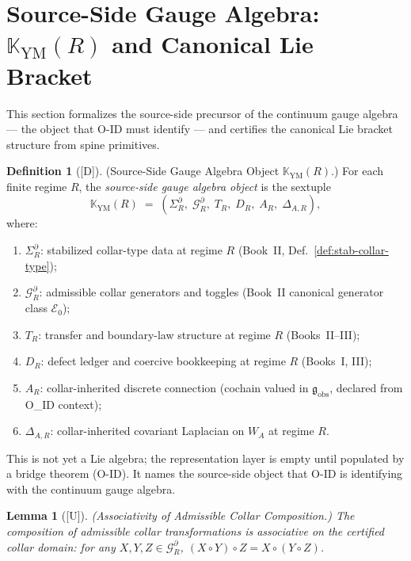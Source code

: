 \documentclass[12pt,oneside]{amsbook}
\theoremstyle{plain}
\newtheorem{lemma}[theorem]{Lemma}
\theoremstyle{definition}
\newtheorem{definition}[theorem]{Definition}
\theoremstyle{remark}
\newcommand{\status}[1]{\textup{[#1]}}
\begin{document}
\section{Source-Side Gauge Algebra: $\mathbb{K}_{\mathrm{YM}}(R)$ and
Canonical Lie Bracket}
\label{sec:kym-bracket}

This section formalizes the source-side precursor of the continuum
gauge algebra --- the object that O-ID must identify --- and
certifies the canonical Lie bracket structure from spine primitives.

\begin{definition}[\status{D}]\label{def:K-YM}
\textup{(Source-Side Gauge Algebra Object $\mathbb{K}_{\mathrm{YM}}(R)$.)}
For each finite regime $R$, the \emph{source-side gauge algebra object}
is the sextuple
\[
 \mathbb{K}_{\mathrm{YM}}(R) \;=\;
 (\Sigma_R^\partial,\; \mathcal{G}_R^\partial,\; T_R,\;
 D_R,\; A_R,\; \Delta_{A,R}),
\]
where:
\begin{enumerate}[label=\textup{(\arabic*)}]
 \item $\Sigma_R^\partial$: stabilized collar-type data at regime $R$
 (Book~II, Def.~\ref{def:stab-collar-type});
 \item $\mathcal{G}_R^\partial$: admissible collar generators and
 toggles (Book~II canonical generator class $\mathcal{E}_0$);
 \item $T_R$: transfer and boundary-law structure at regime $R$
 (Books~II--III);
 \item $D_R$: defect ledger and coercive bookkeeping at regime $R$
 (Books~I, III);
 \item $A_R$: collar-inherited discrete connection (cochain valued in
 $\mathfrak{g}_{\mathrm{obs}}$, declared from O\_ID context);
 \item $\Delta_{A,R}$: collar-inherited covariant Laplacian on $W_A$
 at regime $R$.
\end{enumerate}
This is not yet a Lie algebra; the representation layer is empty
until populated by a bridge theorem (O-ID). It names the
source-side object that O-ID is identifying with the continuum
gauge algebra.
\end{definition}

\begin{lemma}[\status{U}]\label{lem:collar-assoc}
\textup{(Associativity of Admissible Collar Composition.)}
The composition of admissible collar transformations is associative
on the certified collar domain: for any $X, Y, Z \in \mathcal{G}_R^\partial$,
$(X \circ Y) \circ Z = X \circ (Y \circ Z)$.
\end{lemma}
\end{document}
